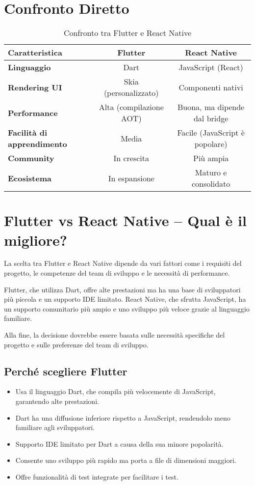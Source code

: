 \documentclass[a4paper,10pt]{article}
\begin{document}
\section{Confronto Diretto}
\begin{table}[h]
    \centering
    \begin{tabular}{lcc}
        \toprule
        \textbf{Caratteristica} & \textbf{Flutter} & \textbf{React Native} \\
        \midrule
        \textbf{Linguaggio} & Dart & JavaScript (React) \\
        \textbf{Rendering UI} & Skia (personalizzato) & Componenti nativi \\
        \textbf{Performance} & Alta (compilazione AOT) & Buona, ma dipende dal bridge \\
        \textbf{Facilità di apprendimento} & Media & Facile (JavaScript è popolare) \\
        \textbf{Community} & In crescita & Più ampia \\
        \textbf{Ecosistema} & In espansione & Maturo e consolidato \\
        \bottomrule
    \end{tabular}
    \caption{Confronto tra Flutter e React Native}
\end{table}

\section{Flutter vs React Native – Qual è il migliore?}
La scelta tra Flutter e React Native dipende da vari fattori come i requisiti del progetto, le competenze del team di sviluppo e le necessità di performance.

Flutter, che utilizza Dart, offre alte prestazioni ma ha una base di sviluppatori più piccola e un supporto IDE limitato. React Native, che sfrutta JavaScript, ha un supporto comunitario più ampio e uno sviluppo più veloce grazie al linguaggio familiare.

Alla fine, la decisione dovrebbe essere basata sulle necessità specifiche del progetto e sulle preferenze del team di sviluppo.

\subsection{Perché scegliere Flutter}
\begin{itemize}
    \item Usa il linguaggio Dart, che compila più velocemente di JavaScript, garantendo alte prestazioni.
    \item Dart ha una diffusione inferiore rispetto a JavaScript, rendendolo meno familiare agli sviluppatori.
    \item Supporto IDE limitato per Dart a causa della sua minore popolarità.
    \item Consente uno sviluppo più rapido ma porta a file di dimensioni maggiori.
    \item Offre funzionalità di test integrate per facilitare i test.
\end{itemize}
\end{document}
